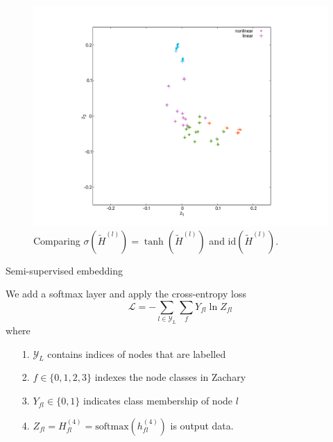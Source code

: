 \documentclass[mathserif,10pt]{beamer}
\begin{document}
\begin{frame}
  \begin{figure}
    \includegraphics[scale=0.25]{figs/fig01c.pdf}
    \caption{Comparing $\sigma(\tilde{H}^{(l)}) = \tanh(\tilde{H}^{(l)})$ and $\text{id}(\tilde{H}^{(l)})$.}
  \end{figure}
\end{frame}

\begin{frame}{Semi-supervised embedding}

We add a softmax layer and apply the cross-entropy loss
\begin{equation}
  \mathcal{L} = -\sum_{l \in \mathcal{Y}_L} \sum_f Y_{fl} \ln Z_{fl}
\end{equation}
where 
\begin{itemize}
  \item[1.] $\mathcal{Y}_L$ contains indices of nodes that are labelled
  \item[2.] $f \in \lbrace 0, 1, 2, 3 \rbrace$ indexes the node classes in Zachary
  \item[3.] $Y_{fl} \in \lbrace 0, 1\rbrace$ indicates class membership of node $l$
  \item[4.] $Z_{fl} = H^{(4)}_{fl} = \text{softmax}(h_{fl}^{(4)})$ is output data.
\end{itemize}
\end{frame}
\end{document}
